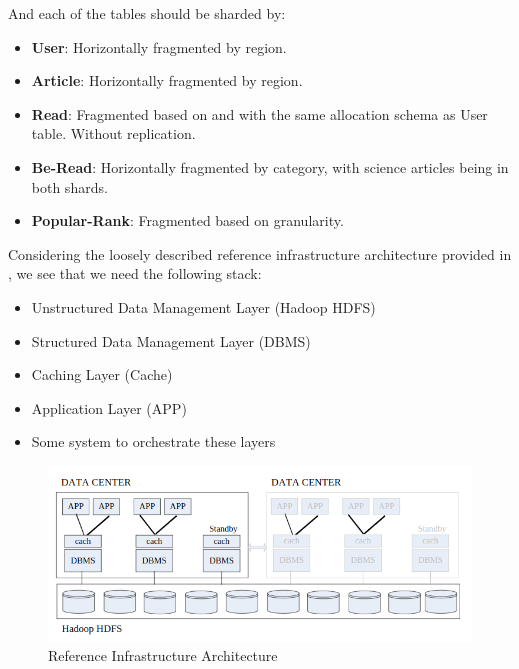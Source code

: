\documentclass{report}
\begin{document}
    And each of the tables should be sharded by:

    \begin{itemize}
        \item \textbf{User}: Horizontally fragmented by region.
        \item \textbf{Article}: Horizontally fragmented by region.
        \item \textbf{Read}: Fragmented based on and with the same allocation schema as User table. Without replication.
        \item \textbf{Be-Read}: Horizontally fragmented by category, with science articles being in both shards.
        \item \textbf{Popular-Rank}: Fragmented based on granularity.
    \end{itemize}

    Considering the loosely described reference infrastructure architecture provided in , we see that we need the following stack:

    \begin{itemize}
        \item Unstructured Data Management Layer (Hadoop HDFS)
        \item Structured Data Management Layer (DBMS)
        \item Caching Layer (Cache)
        \item Application Layer (APP)
        \item Some system to orchestrate these layers
    \end{itemize}

    \begin{figure}[H]
        \centering
        \includegraphics[width=\textwidth]{images/reference-architecture}
        \caption{Reference Infrastructure Architecture}
        \label{fig:reference-infrastructure-architecture}
    \end{figure}
\end{document}
